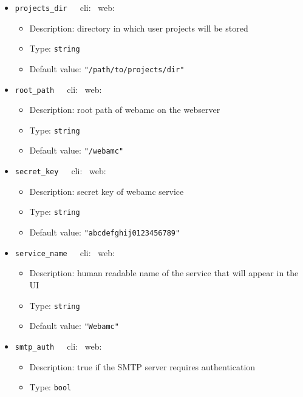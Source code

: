 {\begin{itemize}[itemsep=0pt,parsep=0pt,topsep=0pt,partopsep=0pt]
\begin{itemize}[itemsep=0pt,parsep=0pt,topsep=0pt,partopsep=0pt]
  \item Type:  {\tt{int}}
  \item Default value:  {\tt{3600}}
  \end{itemize}
\item{\tt{projects\_dir}}~~~cli: \xmark~web: \cmark
  \begin{itemize}[itemsep=0pt,parsep=0pt,topsep=0pt,partopsep=0pt]
  \item Description:  directory in which user projects will be stored
  \item Type:  {\tt{string}}
  \item Default value:  {\tt{"/path/to/projects/dir"}}
  \end{itemize}
\item{\tt{root\_path}}~~~cli: \xmark~web: \cmark
  \begin{itemize}[itemsep=0pt,parsep=0pt,topsep=0pt,partopsep=0pt]
  \item Description:  root path of webamc on the webserver
  \item Type:  {\tt{string}}
  \item Default value:  {\tt{"/webamc"}}
  \end{itemize}
\item{\tt{secret\_key}}~~~cli: \xmark~web: \cmark
  \begin{itemize}[itemsep=0pt,parsep=0pt,topsep=0pt,partopsep=0pt]
  \item Description:  secret key of webamc service
  \item Type:  {\tt{string}}
  \item Default value:  {\tt{"abcdefghij0123456789"}}
  \end{itemize}
\item{\tt{service\_name}}~~~cli: \xmark~web: \cmark
  \begin{itemize}[itemsep=0pt,parsep=0pt,topsep=0pt,partopsep=0pt]
  \item Description:  human readable name of the service that will appear in the UI
  \item Type:  {\tt{string}}
  \item Default value:  {\tt{"Webamc"}}
  \end{itemize}
\item{\tt{smtp\_auth}}~~~cli: \xmark~web: \cmark
  \begin{itemize}[itemsep=0pt,parsep=0pt,topsep=0pt,partopsep=0pt]
  \item Description:  true if the SMTP server requires authentication
  \item Type:  {\tt{bool}}

\end{itemize}
\end{itemize}}
